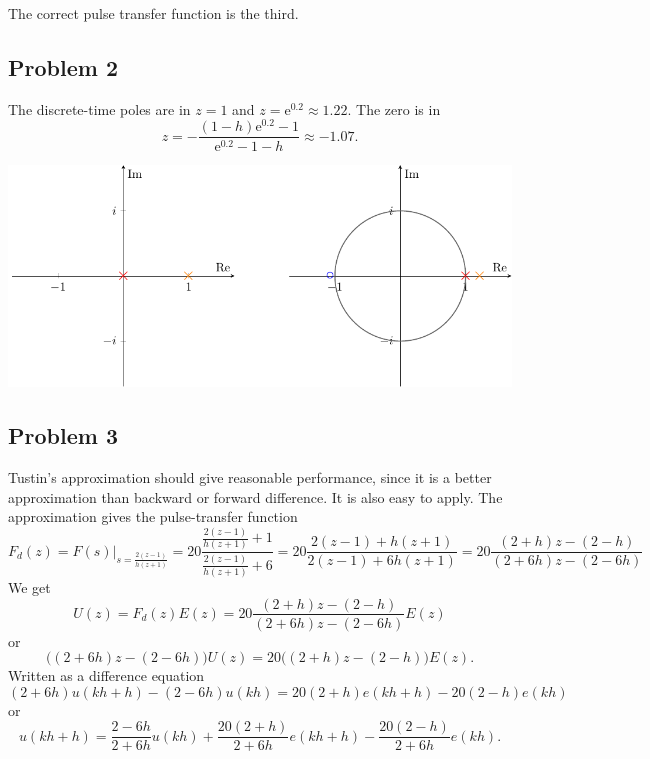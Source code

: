 \documentclass[a4paper,12pt]{article}
\newcommand*{\mexp}[1]{\ensuremath{\mathrm{e}^{#1}}}
\begin{document}
   The correct pulse transfer function is the third.

\subsection*{Problem 2}
The discrete-time poles are in $z=1$ and $z=\mexp{0.2} \approx 1.22$. The zero is  in 
\[ z = - \frac{(1-h)\mexp{0.2} - 1}{\mexp{0.2} - 1 -h} \approx -1.07. \]
\begin{center}
\includegraphics[width=0.8\linewidth]{complex-plane-facit}
\end{center}
 
\subsection*{Problem 3}
Tustin's approximation should give reasonable performance, since it is a better approximation than backward or forward difference. It is also easy to apply. The approximation gives the pulse-transfer function
\[ F_d(z) = F(s)|_{s= \frac{2(z-1)}{h(z+1)}} = 20 \frac{ \frac{2(z-1)}{h(z+1)} + 1 }{ \frac{2(z-1)}{h(z+1)} + 6} = 20 \frac{2(z-1) + h(z+1)}{2(z-1) + 6h(z+1)} = 20 \frac{(2+h)z - (2-h)}{(2+6h)z - (2-6h)} \]
We get
\[ U(z) = F_d(z)E(z) = 20 \frac{(2+h)z - (2-h)}{(2+6h)z - (2-6h)} E(z) \]
or
\[ \big( (2+6h) z - (2-6h) \big) U(z) = 20 \big( (2+h)z - (2-h) \big) E(z). \]
Written as a difference equation 
\[ (2+6h) u(kh+h) - (2-6h)u(kh) = 20 (2+h) e(kh+h) - 20 (2-h) e(kh)\]
or
\[ u(kh+h) = \frac{2-6h}{2+6h} u(kh) + \frac{20(2+h)}{2+6h} e(kh+h) - \frac{20(2-h)}{2+6h} e(kh). \]
\end{document}
